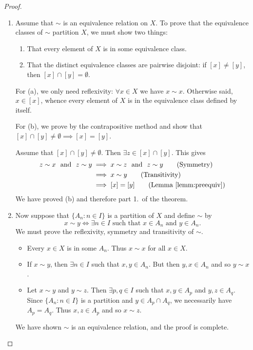 \begin{proof}
	\begin{enumerate}
		\item Assume that $\sim$ is an equivalence relation on $X$. To prove that the equivalence classes of $\sim$ partition $X$, we must show two things:
		\begin{enumerate}
	  	\item That every element of $X$ is in some equivalence class.
	  	\item That the distinct equivalence classes are pairwise disjoint: if $[x]\neq[y]$, then $[x]\cap[y]=\emptyset$.
		\end{enumerate}
		For (a), we only need reflexivity: $\forall x\in X$ we have $x\sim x$. Otherwise said, $x\in[x]$, whence every element of $X$ is in the equivalence class defined by itself.\par
		For (b), we prove by the contrapositive method and show that $[x]\cap [y]\neq\emptyset\implies [x]=[y]$.\par
		Assume that $[x]\cap [y]\neq\emptyset$. Then $\exists z\in [x]\cap [y]$. This gives
		\begin{align*}
			z\sim x\ \text{ and }\ z\sim y&\implies x\sim z\ \text{ and }\ z\sim y\tag*{(Symmetry)}\\*
			&\implies x\sim y\tag*{(Transitivity)}\\*
			&\implies [x]=[y]\tag*{(Lemma \ref{lemm:preequiv})}
		\end{align*}
		We have proved (b) and therefore part 1.\ of the theorem.
		\item Now suppose that $\{A_n:n\in I\}$ is a partition of $X$ and define $\sim$ by
		\[
			x\sim y\iff \exists n\in I\text{ such that $x\in A_n$ and $y\in A_n$.}
		\]
		We must prove the reflexivity, symmetry and transitivity of $\sim$.
		\begin{itemize}
			\item {} Every $x\in X$ is in some $A_n$. Thus $x\sim x$ for all $x\in X$.
			\item \symm If $x\sim y$, then $\exists n\in I$ such that $x,y\in A_n$. But then $y,x\in A_n$ and so $y\sim x$.
			\item \trans Let $x\sim y$ and $y\sim z$. Then $\exists p,q\in I$ such that $x,y\in A_p$ and $y,z\in A_q$. Since $\{A_n:n\in I\}$ is a partition and $y\in A_p\cap A_q$, we necessarily have $A_p=A_q$. Thus $x,z\in A_p$ and so $x\sim z$.
		\end{itemize}
	
		We have shown $\sim$ is an equivalence relation, and the proof is complete.\qedhere
	\end{enumerate}
\end{proof}
	
